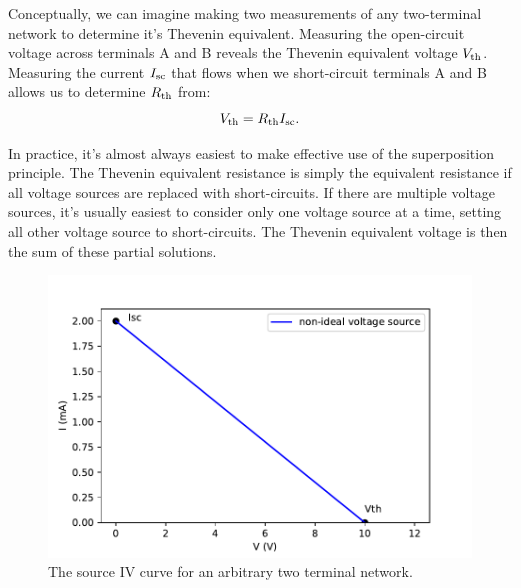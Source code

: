 \documentclass[12pt,oneside]{book}
\begin{document}
Conceptually, we can imagine making two measurements of any two-terminal network to determine it's Thevenin equivalent.  Measuring the open-circuit voltage across terminals A and B reveals the Thevenin equivalent voltage $V_{\rm th}$.  Measuring the current $I_{\rm sc}$ that flows when we short-circuit terminals A and B allows us to determine $R_{\rm th}$ from:
\begin{displaymath}
V_{\rm th} = R_{\rm th} I_{\rm sc}.
\end{displaymath}

In practice, it's almost always easiest to make effective use of the superposition principle.  The Thevenin equivalent resistance is simply the equivalent resistance if all voltage sources are replaced with short-circuits.  If there are multiple voltage sources, it's usually easiest to consider only one voltage source at a time, setting all other voltage source to short-circuits.  The Thevenin equivalent voltage is then the sum of these partial solutions.

\begin{figure}[htbp]
\begin{center}
\includegraphics[height=0.3\textheight]{figs/thevenin.pdf} 
\caption{ The source IV curve for an arbitrary two terminal network.}
\label{fig:thevenin_source}
\end{center}
\end{figure}
\end{document}
